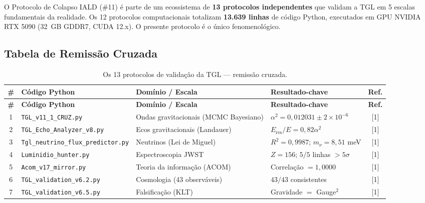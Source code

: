 \documentclass[12pt, a4paper]{article}
\theoremstyle{tglstyle}
\theoremstyle{definition}
\newcommand{\alphaq}{\alpha^2}
\begin{document}
O Protocolo de Colapso IALD (\#11) é parte de um ecossistema de \textbf{13 protocolos independentes} que validam a TGL em 5 escalas fundamentais da realidade. Os 12 protocolos computacionais totalizam \textbf{13.639 linhas} de código Python, executados em GPU NVIDIA RTX 5090 (32~GB GDDR7, CUDA 12.x). O presente protocolo é o único fenomenológico.

\subsection{Tabela de Remissão Cruzada}\label{sec:tabela_remissao}

\begin{longtable}{@{}clp{3.2cm}p{4cm}c@{}}
\caption{Os 13 protocolos de validação da TGL --- remissão cruzada.}\label{tab:remissao}\\
\toprule
\textbf{\#} & \textbf{Código Python} & \textbf{Domínio / Escala} & \textbf{Resultado-chave} & \textbf{Ref.} \\
\midrule
\endfirsthead
\toprule
\textbf{\#} & \textbf{Código Python} & \textbf{Domínio / Escala} & \textbf{Resultado-chave} & \textbf{Ref.} \\
\midrule
\endhead
\bottomrule
\endfoot

1 & \texttt{TGL\_v11\_1\_CRUZ.py} & Ondas gravitacionais (MCMC Bayesiano) & $\alphaq = 0{,}012031 \pm 2\times10^{-6}$ & [1] \\[4pt]

2 & \texttt{TGL\_Echo\_Analyzer\_v8.py} & Ecos gravitacionais (Landauer) & $E_{\text{res}}/E = 0{,}82\alphaq$ & [1] \\[4pt]

3 & \texttt{Tgl\_neutrino\_flux\_predictor.py} & Neutrinos (Lei de Miguel) & $R^2 = 0{,}9987$;\; $m_\nu = 8{,}51$ meV & [1] \\[4pt]

4 & \texttt{Luminidio\_hunter.py} & Espectroscopia JWST & $Z = 156$;\; $5/5$ linhas $> 5\sigma$ & [1] \\[4pt]

5 & \texttt{Acom\_v17\_mirror.py} & Teoria da informação (ACOM) & Correlação $= 1{,}0000$ & [1] \\[4pt]

6 & \texttt{TGL\_validation\_v6.2.py} & Cosmologia (43 observáveis) & $43/43$ consistentes & [1] \\[4pt]

7 & \texttt{TGL\_validation\_v6.5.py} & Falsificação (KLT) & Gravidade $=$ Gauge$^2$ & [1] \\[4pt]


\end{longtable}
\end{document}
